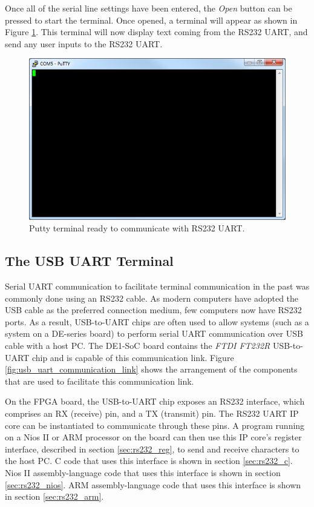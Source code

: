 \documentclass[11pt, twoside, pdftex]{article}
\begin{document}
Once all of the serial line settings have been entered, the \textit{Open} button can be pressed to start the terminal. Once opened, a terminal will appear as shown in Figure \ref{fig:putty_4}. This terminal will now display text coming from the RS232 UART, and send any user inputs to the RS232 UART.

\begin{figure}[h!]
   \begin{center}
       \includegraphics[scale=0.7]{figures/fig_putty_tut_4}
   \end{center}
   \caption{Putty terminal ready to communicate with RS232 UART.}
	\label{fig:putty_4}
\end{figure}

\subsection{The USB UART Terminal}

Serial UART communication to facilitate terminal communication in the past was commonly done using an RS232 cable. As modern computers have adopted the USB cable as the preferred connection medium, few computers now have RS232 ports. As a result, USB-to-UART chips are often used to allow systems (such as a system on a DE-series board) to perform serial UART communication over USB cable with a host PC. The DE1-SoC board contains the \textit{FTDI FT232R} USB-to-UART chip and is capable of this communication link. Figure \ref{fig:usb_uart_communication_link} shows the arrangement of the components that are used to facilitate this communication link.

On the FPGA board, the USB-to-UART chip exposes an RS232 interface, which comprises an RX (receive) pin, and a TX (transmit) pin. The RS232 UART IP core can be instantiated to communicate through these pins. A program running on a Nios II or ARM processor on the board can then use this IP core's register interface, described in section \ref{sec:rs232_reg}, to send and receive characters to the host PC. C code that uses this interface is shown in section \ref{sec:rs232_c}. Nios II assembly-language code that uses this interface is shown in section \ref{sec:rs232_nios}. ARM assembly-language code that uses this interface is shown in section \ref{sec:rs232_arm}.
\end{document}
